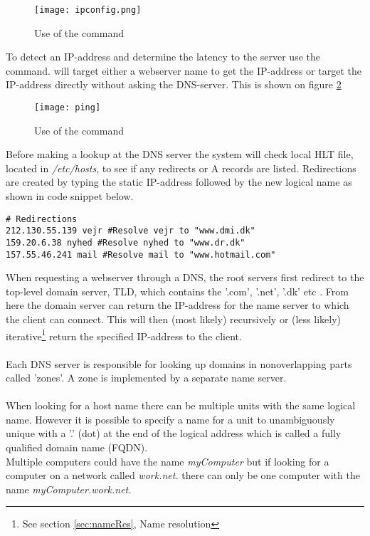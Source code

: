 \documentclass[Main]{subfiles}
\begin{document}
\begin{figure}[H]
\centering
\texttt{[image: ipconfig.png]}
\caption{Use of the command }
\label{fig:ipconfig}
\end{figure}

To detect an IP-address and determine the latency to the server use the  command.
 will target either a webserver name to get the IP-address or target the IP-address directly without asking the DNS-server.
This is shown on figure \ref{fig:ping}


\begin{figure}[H]
\centering
\texttt{[image: ping]}
\caption{Use of the command }
\label{fig:ping}
\end{figure}


Before making a lookup at the DNS server the system will check local HLT file, located in  \textit{/etc/hosts}, to see if any redirects or A records are listed.
Redirections are created by typing the static IP-address followed by the new logical name as shown in code snippet below.


\begin{lstlisting}[caption={Hosts file redirection}, style=Code-Bash, label=lst:redirect]
# Redirections
212.130.55.139 vejr #Resolve vejr to "www.dmi.dk"
159.20.6.38 nyhed #Resolve nyhed to "www.dr.dk"
157.55.46.241 mail #Resolve mail to "www.hotmail.com"
\end{lstlisting}

\vspace{10px}

When requesting a webserver through a DNS, the root servers first redirect to the top-level domain server, TLD, which contains the '.com', '.net', '.dk' etc \cite[p. 192]{Tanenbaum}.
From here the domain server can return the IP-address for the name server to which the client can connect. 
This will then (most likely) recursively or (less likely) iterative\footnote{See section \ref{sec:nameRes}, Name resolution} return the specified IP-address to the client.
\\
\\
Each DNS server is responsible for looking up domains in nonoverlapping parts called 'zones'. 
A zone is implemented by a separate name server\cite[p. 202-205]{Tanenbaum}.
\\
\\
When looking for a host name there can be multiple units with the same logical name. 
However it is possible to specify a name for a unit to unambiguously unique with a '.' (dot) at the end of the logical address which is called a fully qualified domain name (FQDN)\cite{wiki-fqdn}.
\\
Multiple computers could have the name \textit{myComputer} but if looking for a computer on a network called \textit{work.net.} there can only be one computer with the name \textit{myComputer.work.net.}
\end{document}
